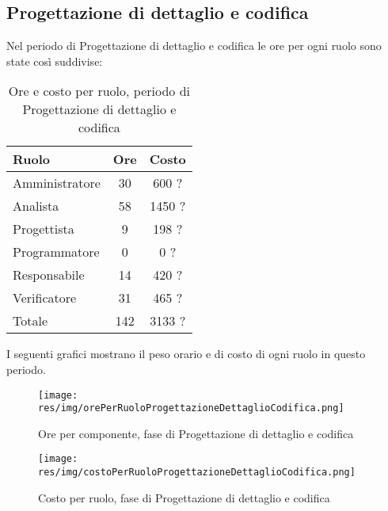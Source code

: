 \subsection{Progettazione di dettaglio e codifica}
Nel periodo di Progettazione di dettaglio e codifica le ore per ogni ruolo sono state così suddivise:

\begin{table}[H]
	\centering
	\begin{tabular}{ l c c }
		\textbf{Ruolo} & \textbf{Ore} & \textbf{Costo} \\
		\hline
		Amministratore & 30 & 600 ? \\
		Analista & 58 & 1450 ? \\
		Progettista & 9 & 198 ? \\
		Programmatore & 0 & 0 ? \\
		Responsabile & 14 & 420 ? \\
		Verificatore & 31 & 465 ? \\
		\hline
		Totale & 142 & 3133 ? \\
		\hline
	\end{tabular}
	\caption{Ore e costo per ruolo, periodo di Progettazione di dettaglio e codifica}
\end{table}

I seguenti grafici mostrano il peso orario e di costo di ogni ruolo in questo periodo.

\begin{figure}[H]
  \begin{center}
    \texttt{[image: res/img/orePerRuoloProgettazioneDettaglioCodifica.png]}
  \caption{Ore per componente, fase di Progettazione di dettaglio e codifica}
  \end{center} 
\end{figure}  

\begin{figure}[H]
  \begin{center}
    \texttt{[image: res/img/costoPerRuoloProgettazioneDettaglioCodifica.png]}
  \caption{Costo per ruolo, fase di Progettazione di dettaglio e codifica}
  \end{center} 
\end{figure}  


